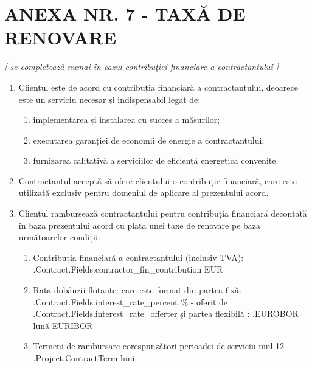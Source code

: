 \section{ANEXA NR. 7 - TAXĂ DE RENOVARE}

\textit{[ se completează numai în cazul contribuţiei financiare a contractantului  ]}

\begin{enumerate}

\item Clientul este de acord cu contribuția financiară a contractantului, deoarece este un serviciu necesar și indispensabil legat de:

  \begin{enumerate}
  \item implementarea și instalarea cu succes a măsurilor;
  \item executarea garanției de economii de energie a contractantului;
  \item furnizarea calitativă a serviciilor de eficiență energetică convenite.
  \end{enumerate}

\item Contractantul acceptă să ofere clientului o contribuție financiară, care este utilizată exclusiv pentru domeniul de aplicare al prezentului acord.

\item Clientul rambursează contractantului pentru contribuția financiară decontată în baza prezentului acord cu plata unei taxe de renovare pe baza următoarelor condiții:

  \begin{enumerate}
  \item Contribuția financiară a contractantului (inclusiv TVA): \iffalse input fields.contractor_fin_contribution value="{{.Contract.Fields.contractor_fin_contribution}}" \fi {{.Contract.Fields.contractor_fin_contribution}} EUR
    \item Rata dobânzii flotante:
care este format din partea fixă:         \iffalse input fields.interest_rate_percent value="{{.Contract.Fields.interest_rate_percent}}" \fi {{.Contract.Fields.interest_rate_percent}} \%
 - oferit de \iffalse input fields.interest_rate_offerter value="{{.Contract.Fields.interest_rate_offerter}}" \fi {{.Contract.Fields.interest_rate_offerter}}
şi partea flexibilă : {{.EUROBOR}} lună EURIBOR
  \item Termeni de rambursare corespunzători perioadei de serviciu {{mul 12 .Project.ContractTerm}} luni
  \end{enumerate}


\end{enumerate}
